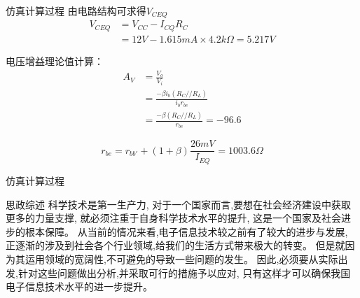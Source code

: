 \documentclass[UTF8]{ctexbeamer}
\begin{document}
\begin{frame}{仿真计算过程}
由电路结构可求得$V_{CEQ}$
\begin{equation}
  \begin{split}
    V_{CEQ}&=V_{CC}-I_{CQ}R_C\\
    &=12V-1.615mA\times 4.2k\Omega=5.217V
  \end{split}
\end{equation}

电压增益理论值计算：
\begin{equation}
  \begin{split}
    A_V&=\frac{V_o}{V_i}\\
    &=\frac{-\beta i_b(R_C//R_L)}{i_br_{be}}\\
    &=\frac{-\beta(R_C//R_L)}{r_{be}}=-96.6
  \end{split}
\end{equation}

\begin{equation}
  r_{be}=r_{bb'}+(1+\beta)\frac{26mV}{I_{EQ}}=1003.6\Omega
\end{equation}
\end{frame}

\begin{frame}{仿真计算过程}
\end{frame}

\begin{frame}{思政综述} 
    科学技术是第一生产力,
对于一个国家而言,要想在社会经济建设中获取更多的力量支撑,
就必须注重于自身科学技术水平的提升,
这是一个国家及社会进步的根本保障。
从当前的情况来看,电子信息技术较之前有了较大的进步与发展,
正逐渐的涉及到社会各个行业领域,给我们的生活方式带来极大的转变。
但是就因为其运用领域的宽阔性,不可避免的导致一些问题的发生。
因此,必须要从实际出发,针对这些问题做出分析,并采取可行的措施予以应对,
只有这样才可以确保我国电子信息技术水平的进一步提升。
\end{frame} 
\end{document}
